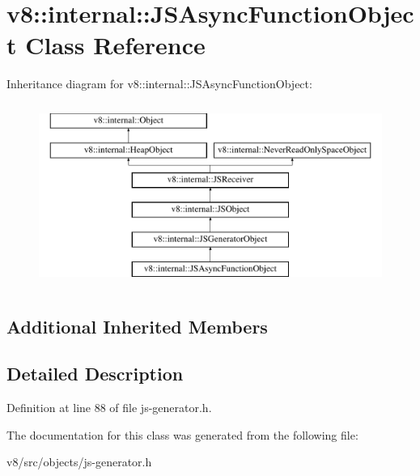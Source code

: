 \hypertarget{classv8_1_1internal_1_1JSAsyncFunctionObject}{}\section{v8\+:\+:internal\+:\+:J\+S\+Async\+Function\+Object Class Reference}
\label{classv8_1_1internal_1_1JSAsyncFunctionObject}
Inheritance diagram for v8\+:\+:internal\+:\+:J\+S\+Async\+Function\+Object\+:\begin{figure}[H]
\begin{center}
\leavevmode
\includegraphics[height=6.000000cm]{classv8_1_1internal_1_1JSAsyncFunctionObject}
\end{center}
\end{figure}
\subsection*{Additional Inherited Members}


\subsection{Detailed Description}


Definition at line 88 of file js-\/generator.\+h.



The documentation for this class was generated from the following file\+:\begin{DoxyCompactItemize}
\item 
v8/src/objects/js-\/generator.\+h\end{DoxyCompactItemize}
